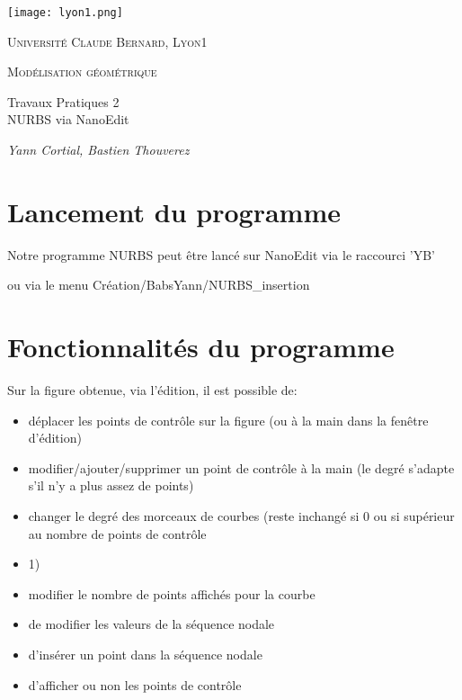 \documentclass[10pt]{article}
\begin{document}
\begin{titlepage}
	\centering
	{\texttt{[image: lyon1.png]}\par}
	\vspace{.5cm}
	{\scshape\large Universit\'e Claude Bernard, Lyon1 \par}
	\vspace{2cm}
	{\scshape\LARGE Modélisation géométrique \par}
	\vspace{1cm}
	{\huge\bfseries \Huge{Travaux Pratiques 2\\ NURBS via NanoEdit\par}}
	\vfill
	{\Large\itshape Yann Cortial, Bastien Thouverez\par}

\end{titlepage}



\section{Lancement du programme}
Notre programme NURBS peut être lancé sur NanoEdit via le raccourci 'YB'

ou via le menu Création/BabsYann/NURBS\_insertion


\section{Fonctionnalités du programme}

Sur la figure obtenue, via l'édition, il est possible de:
 \begin{itemize}
\item déplacer les points de contrôle sur la figure (ou à la main dans la fenêtre d'édition)
\item modifier/ajouter/supprimer un point de contrôle à la main (le degré s'adapte s'il n'y a plus assez de points)
\item changer le degré des morceaux de courbes (reste inchangé si 0 ou si supérieur au nombre de points de contrôle \item 1)
\item modifier le nombre de points affichés pour la courbe
\item de modifier les valeurs de la séquence nodale
\item d'insérer un point dans la séquence nodale
\item d'afficher ou non les points de contrôle
 
 \end{itemize}
\end{document}
